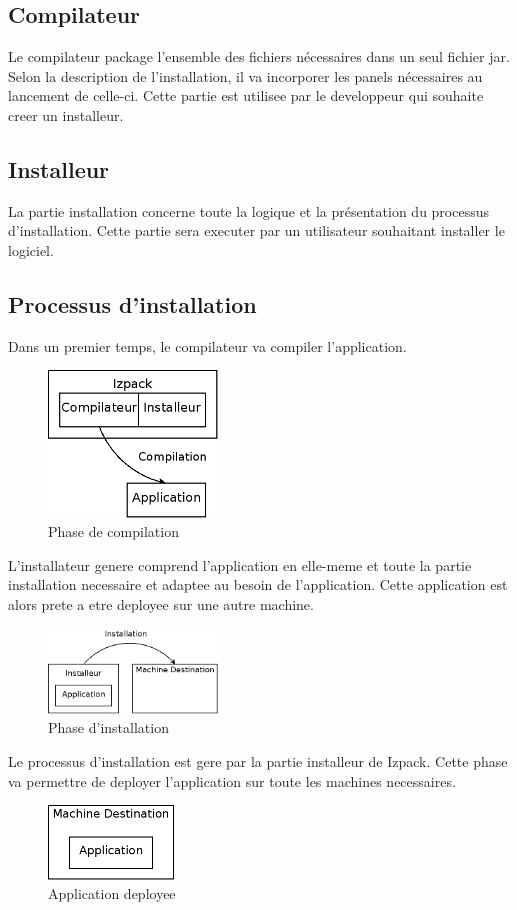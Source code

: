\subsection{Compilateur}
Le compilateur package l'ensemble des fichiers nécessaires dans un seul fichier jar. Selon la description de l'installation, il va incorporer les panels nécessaires au lancement de celle-ci. Cette partie est utilisee par le developpeur qui souhaite creer un installeur.
\subsection{Installeur}
La partie installation concerne toute la logique et la présentation du processus d'installation. Cette partie sera executer par un utilisateur souhaitant installer le logiciel.
\subsection{Processus d'installation}
Dans un premier temps, le compilateur va compiler l'application.
\begin{figure}[H]
	\centering
	\includegraphics[width=0.4\textwidth]{../image/archi_architecture.png}
	\caption{Phase de compilation}
\end{figure}
L'installateur genere comprend l'application en elle-meme et toute la partie installation necessaire et adaptee au besoin de l'application. Cette application est alors prete a etre deployee sur une autre machine.
\begin{figure}[H]
	\centering
	\includegraphics[width=0.4\textwidth]{../image/archi_installation.png}
	\caption{Phase d'installation}
\end{figure}
Le processus d'installation est gere par la partie installeur de Izpack. Cette phase va permettre de deployer l'application sur toute les machines necessaires.
\begin{figure}[H]
	\centering
	\includegraphics[width=0.3\textwidth]{../image/archi_installe.png}
	\caption{Application deployee}
\end{figure}

